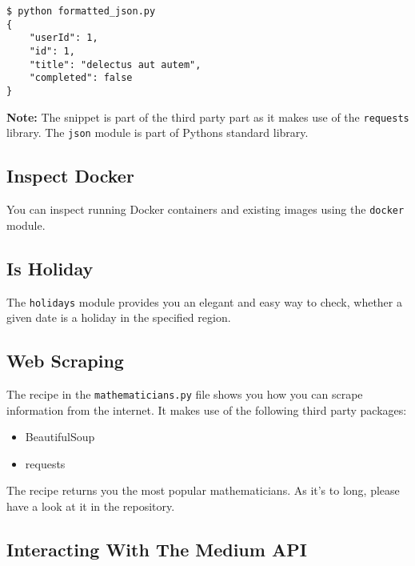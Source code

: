 

\begin{lstlisting}[caption=Output of formatted\_json.py]
$ python formatted_json.py
{
    "userId": 1,
    "id": 1,
    "title": "delectus aut autem",
    "completed": false
}
\end{lstlisting}

\textbf{Note:} The snippet is part of the third party part as it makes use of the \lstinline{requests} library.
The \lstinline{json} module is part of Pythons standard library.


\subsection{Inspect Docker}

You can inspect running Docker containers and existing images using the \lstinline{docker} module.




\subsection{Is Holiday}

The \lstinline{holidays} module provides you an elegant and easy way to check, whether a given date is a holiday in the specified region.




\subsection{Web Scraping}

The recipe in the \lstinline{mathematicians.py} file shows you how you can scrape information from the internet.
It makes use of the following third party packages:

\begin{itemize}
    \item BeautifulSoup
    \item requests
\end{itemize}

The recipe returns you the most popular mathematicians.
As it's to long, please have a look at it in the repository.


\subsection{Interacting With The Medium API}

